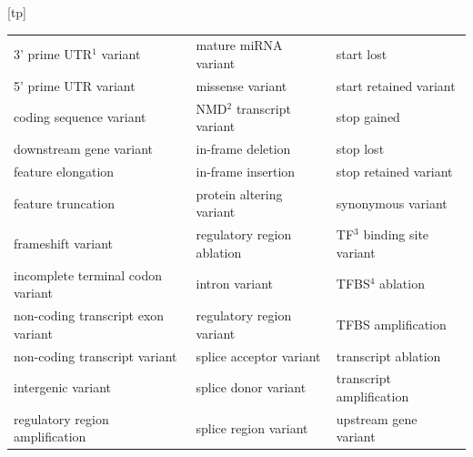 \documentclass[a4paper,nohyper,nobib,openany,justified]{tufte-book}
\makeatletter
\renewenvironment{table}[1][htbp]{%
  \@tufte@orig@float{table}[#1]%
}{%
  \@tufte@orig@endfloat
}
\makeatother
\begin{document}
\begin{fullwidth}
\begin{table}[tp]
  \begin{center}
    \begin{tabular}{lll}
      \toprule
3' prime UTR$^1$ variant              & mature miRNA variant       & start lost               \\
5' prime UTR variant               & missense variant           & start retained variant   \\
coding sequence variant            & NMD$^2$ transcript variant    & stop gained              \\
downstream gene variant            & in-frame deletion          & stop lost                \\
feature elongation                 & in-frame insertion         & stop retained variant    \\
feature truncation                 & protein altering variant   & synonymous variant       \\
frameshift variant                 & regulatory region ablation & TF$^3$ binding site variant \\
incomplete terminal codon variant  & intron variant             & TFBS$^4$ ablation           \\
non-coding transcript exon variant & regulatory region variant  & TFBS amplification       \\
non-coding transcript variant      & splice acceptor variant    & transcript ablation      \\
intergenic variant                 & splice donor variant       & transcript amplification \\
regulatory region amplification    & splice region variant      & upstream gene variant  \\
      \bottomrule
    \end{tabular}
  \end{center}
  \caption{The set of consequence terms provided by VEP. The variants are mapped to the reference genome, and each allele of each variant may have a different effect in different transcripts.\\
$^1$untranslated region; $^2$Nonsense-mediated mRNA decay; $^3$transcription factor; $^4$transcription factor binding site
}
  \label{tab:vepCons}
\end{table}


\end{fullwidth}
\end{document}
